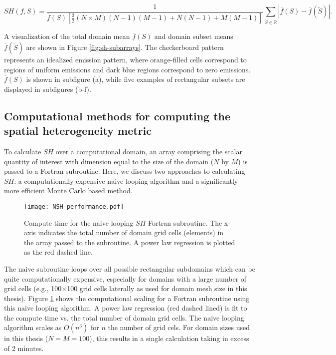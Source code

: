 \begin{equation}
SH(f, S) = \frac{1}{\overline{f}(S)\left[\frac{3}{2}(N\times M)(N-1)(M-1) + N(N-1) + M(M-1)\right]}\sum_{\tilde{S}\in \mathbb{R}}|\overline{f}(S) - \overline{f}(\tilde{S})|.
\end{equation}

A visualization of the total domain mean $\overline{f}(S)$ and domain subset means $\overline{f}(\tilde{S})$ are shown in Figure \ref{fig:sh-subarrays}. The checkerboard pattern represents an idealized emission pattern, where orange-filled cells correspond to regions of uniform emissions and dark blue regions correspond to zero emissions. $\overline{f}(S)$ is shown in subfigure (a), while five examples of rectangular subsets are displayed in subfigures (b-f).


\subsection{Computational methods for computing the spatial heterogeneity metric}
To calculate $SH$ over a computational domain, an array comprising the scalar quantity of interest with dimension equal to the size of the domain ($N$ by $M$) is passed to a Fortran subroutine. Here, we discuss two approaches to calculating $SH$: a computationally expensive naive looping algorithm and a significantly more efficient Monte Carlo based method.

\begin{figure}[h]
	\centering
	\texttt{[image: NSH-performance.pdf]}
	\caption{Compute time for the naive looping $SH$ Fortran subroutine. The x-axis indicates the total number of domain grid cells (elements) in the array passed to the subroutine. A power law regression is plotted as the red dashed line.}
	\label{fig:nsh-performance}
\end{figure}

The naive subroutine loops over all possible rectangular subdomains which can be quite computationally expensive, especially for domains with a large number of grid cells (e.g., 100$\times$100 grid cells laterally as used for domain mesh size in this thesis). Figure \ref{fig:nsh-performance} shows the computational scaling for a Fortran subroutine using this naive looping algorithm. A power law regression (red dashed lined) is fit to the compute time vs. the total number of domain grid cells. The naive looping algorithm scales as $O(n^3)$ for $n$ the number of grid cels. For domain sizes used in this thesis ($N=M=100$), this results in a single calculation taking in excess of 2 minutes.

